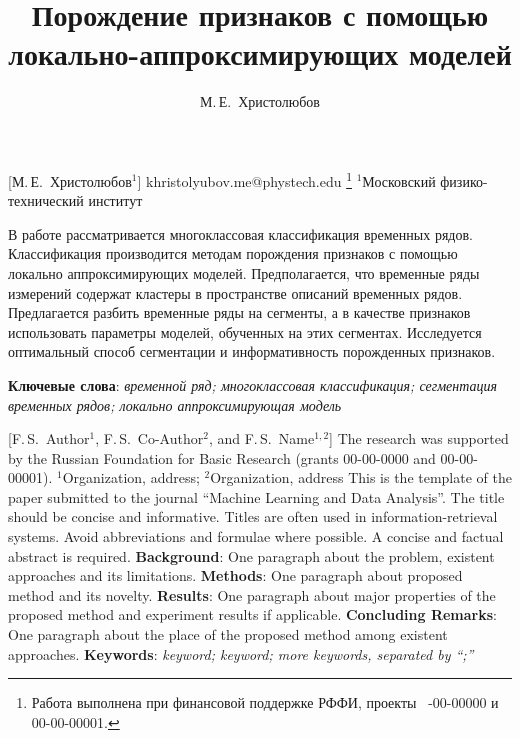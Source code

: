 \documentclass[12pt, twoside]{article}
\begin{document}
\title
    [Порождение признаков с помощью локально-аппроксимирующих моделей] %
    {Порождение признаков с помощью локально-аппроксимирующих моделей}
\author
    [М.\,Е.~Христолюбов] %
    {М.\,Е.~Христолюбов} %
    [М.\,Е.~Христолюбов$^1$] %
\email
    {khristolyubov.me@phystech.edu}
\thanks
    {Работа выполнена при
     финансовой поддержке РФФИ, проекты \No\ -00-00000 и 00-00-00001.}
\organization
    {$^1$Московский физико-технический институт}
\abstract
    {В работе рассматривается многоклассовая классификация временных рядов. Классификация производится методам порождения признаков с помощью локально аппроксимирующих моделей. Предполагается, что временные ряды измерений содержат кластеры в пространстве описаний временных рядов. Предлагается разбить временные ряды на сегменты, а в качестве признаков использовать параметры моделей, обученных на этих сегментах. Исследуется оптимальный способ сегментации и информативность порожденных признаков.
	
\bigskip
\noindent
\textbf{Ключевые слова}: \emph {временной ряд; многоклассовая классификация; сегментация временных рядов; локально аппроксимирующая модель}
}

    [F.\,S.~Author$^1$, F.\,S.~Co-Author$^2$, and F.\,S.~Name$^{1, 2}$] %
\thanksEng
    {The research was
    	 supported by the Russian Foundation for Basic Research (grants 00-00-0000 and 00-00-00001).
    }
\organizationEng
    {$^1$Organization, address; $^2$Organization, address}
\abstractEng
    {This is the template of the paper submitted to the journal ``Machine Learning and Data Analysis''.	
	\noindent
	The title should be concise and informative. Titles are often used in information-retrieval systems. Avoid abbreviations and formulae where possible.
	\noindent
	A concise and factual abstract is required.
	\noindent
	\textbf{Background}: One paragraph about the problem, existent approaches and its limitations.
	\noindent
	\textbf{Methods}: One paragraph about proposed method and its novelty.
	\noindent
	\textbf{Results}: One paragraph about major properties of the proposed method and experiment results if applicable.
	\noindent
	\textbf{Concluding Remarks}: One paragraph about the place of the proposed method among existent approaches.	
	\noindent	
	\noindent
    	\textbf{Keywords}: \emph{keyword; keyword; more keywords, separated by ``;''}}
\end{document}
